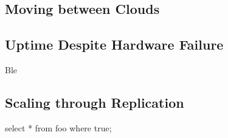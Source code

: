 \documentclass{scrartcl}
\begin{document}
\blindtext

\subsection{Moving between Clouds}
\label{sec:movclouds}

\blindtext

\ParSep

\blindtext

\subsection{Uptime Despite Hardware Failure}
\label{sec:hardfail}

Ble

\subsection{Scaling through Replication}

\begin{code}[language=SQL]
select  * from foo where true;
\end{code}
\blinddocument

%
\end{document}
